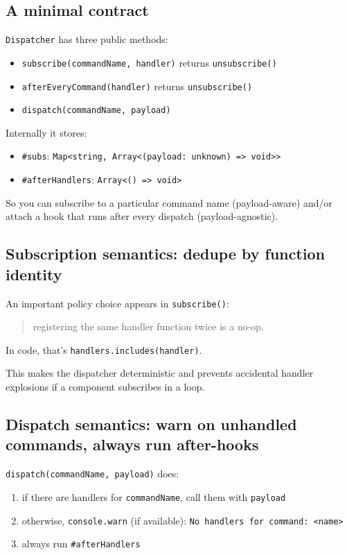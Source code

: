\subsection{A minimal contract}
	\texttt{Dispatcher} has three public methods:

\begin{itemize}
  \item \texttt{subscribe(commandName, handler)} \textrightarrow{} returns \texttt{unsubscribe()}
  \item \texttt{afterEveryCommand(handler)} \textrightarrow{} returns \texttt{unsubscribe()}
  \item \texttt{dispatch(commandName, payload)}
\end{itemize}

Internally it stores:

\begin{itemize}
  \item \texttt{\#subs}: \texttt{Map<string, Array<(payload: unknown) => void>>}
  \item \texttt{\#afterHandlers}: \texttt{Array<() => void>}
\end{itemize}

So you can subscribe to a particular command name (payload-aware) and/or attach a hook that runs after every dispatch (payload-agnostic).

\subsection{Subscription semantics: dedupe by function identity}
An important policy choice appears in \texttt{subscribe()}:

\begin{quote}
  registering the same handler function twice is a no-op.
\end{quote}

In code, that's \texttt{handlers.includes(handler)}.

This makes the dispatcher deterministic and prevents accidental handler explosions if a component subscribes in a loop.

\subsection{Dispatch semantics: warn on unhandled commands, always run after-hooks}
	\texttt{dispatch(commandName, payload)} does:

\begin{enumerate}
  \item if there are handlers for \texttt{commandName}, call them with \texttt{payload}
  \item otherwise, \texttt{console.warn} (if available): \texttt{No handlers for command: <name>}
  \item always run \texttt{\#afterHandlers}
\end{enumerate}

